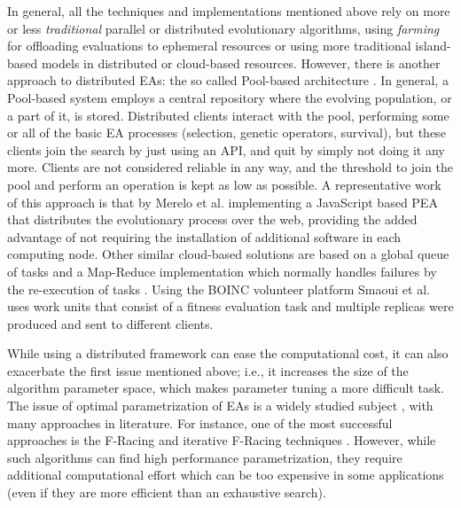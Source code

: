 In general, all the techniques and implementations mentioned above
rely on more or less {\em traditional} parallel or distributed
evolutionary algorithms, using {\em farming} for offloading
evaluations to ephemeral resources or using more traditional
island-based models in distributed or cloud-based resources. However,
there is another approach to distributed EAs: the so called Pool-based
architecture \cite{talukdar1998asynchronous,pool:ga,de1991genetic}. In general, a 
Pool-based system employs a central repository 
where the evolving population, or a part of it, is stored. 
Distributed clients interact with the pool, performing some or all of the basic EA processes 
(selection, genetic operators, survival), but these clients join the
search by just using an API, and quit by simply not doing it any
more. Clients are not considered reliable in any way, and the
threshold to join the pool and perform an operation is kept as low as
possible. 
A representative work of this approach 
is that by Merelo et al. \cite{agajaj} implementing a JavaScript based PEA that distributes 
the evolutionary process over the web, providing the added advantage of not requiring the 
installation of additional software in each computing node.  Other similar cloud-based solutions 
are based on a global queue of tasks and a Map-Reduce implementation which normally handles failures 
by the re-execution of  tasks \cite{fazenda2012,di2013towards,FlexGP}. Using the BOINC 
volunteer platform  Smaoui et al. \cite{FekiNG09} uses work units that consist of a fitness 
evaluation task and multiple replicas  were produced and sent to different clients.

While using a distributed framework can ease the computational cost, 
it can also exacerbate the first issue mentioned above;
i.e., it increases the size of the algorithm parameter space, which makes parameter tuning a more difficult task.
The issue of optimal parametrization of EAs is a widely studied subject \cite{de2007parameter}, 
with many approaches in literature. For instance, one of the most successful approaches 
is the F-Racing and iterative F-Racing techniques \cite{lopez2011irace}. 
However, while such algorithms can find high performance parametrization, 
they require additional computational effort which can be too expensive in some applications
(even if they are more efficient than an exhaustive search).

